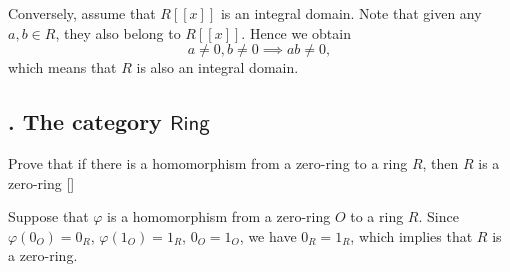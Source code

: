 \documentclass[12pt,letterpaper,boxed]{hmcpset}
\begin{document}
\begin{solution}
\begin{enumerate}
			
		Conversely, assume that $R[[x]]$ is an integral domain. Note that given any $a,b\in R$, they also belong to $R[[x]]$. Hence we obtain 
		\[
		a\ne0,b\ne0\implies ab\ne0,
		\]
		which means that $R$ is also an integral domain.
	\end{enumerate}
\end{solution}


\subsection{. The category $\mathsf{Ring}$}

\begin{problem}[2.1]
	Prove that if there is a homomorphism from a zero-ring to a ring $R$, then $R$ is a zero-ring []
\end{problem}
\begin{solution}
	Suppose that $\varphi$ is a homomorphism from a zero-ring $O$ to a ring $R$. Since $\varphi(0_O)=0_R$, $\varphi(1_O)=1_R$, $0_O=1_O$, we have $0_R=1_R$, which implies that $R$ is a zero-ring.
\end{solution}
\end{document}
